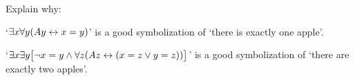 \problempart Explain why:
	\begin{ebullet}
		\item   `$\exists x \forall y(Ay \leftrightarrow x= y)$' is a good symbolization of `there is exactly one apple'.
		\item `$\exists x \exists y \bigl[\neg x = y \wedge \forall z(Az \leftrightarrow (x= z \vee y = z))\bigr]$' is a good symbolization of `there are exactly two apples'.
	\end{ebullet}


%
%
%
